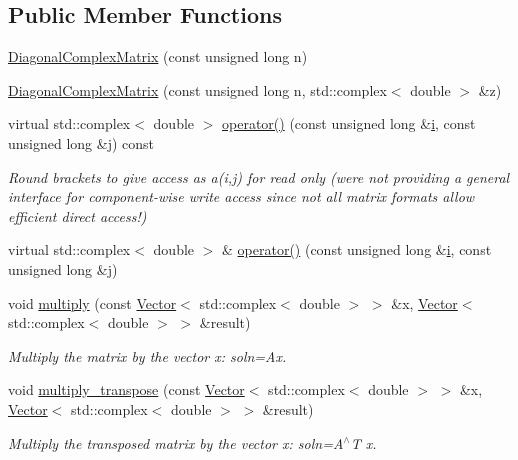 \subsection*{Public Member Functions}
\begin{DoxyCompactItemize}
\item 
\hyperlink{classoomph_1_1DiagonalComplexMatrix_a0d81ded85014d5a703c3a44522bef081}{Diagonal\+Complex\+Matrix} (const unsigned long n)
\item 
\hyperlink{classoomph_1_1DiagonalComplexMatrix_a896c2b0bdf1488b09b6552bb624c5408}{Diagonal\+Complex\+Matrix} (const unsigned long n, std\+::complex$<$ double $>$ \&z)
\item 
virtual std\+::complex$<$ double $>$ \hyperlink{classoomph_1_1DiagonalComplexMatrix_aa8f257263497d498f52881a19281ce63}{operator()} (const unsigned long \&\hyperlink{cfortran_8h_adb50e893b86b3e55e751a42eab3cba82}{i}, const unsigned long \&j) const
\begin{DoxyCompactList}\small\item\em Round brackets to give access as a(i,j) for read only (we\textquotesingle{}re not providing a general interface for component-\/wise write access since not all matrix formats allow efficient direct access!) \end{DoxyCompactList}\item 
virtual std\+::complex$<$ double $>$ \& \hyperlink{classoomph_1_1DiagonalComplexMatrix_a27f2ff667b59a6a115d04a6c40df82a1}{operator()} (const unsigned long \&\hyperlink{cfortran_8h_adb50e893b86b3e55e751a42eab3cba82}{i}, const unsigned long \&j)
\item 
void \hyperlink{classoomph_1_1DiagonalComplexMatrix_a8e7b0ca4ea51eb40fa9fe4fd8e9ba99c}{multiply} (const \hyperlink{classoomph_1_1Vector}{Vector}$<$ std\+::complex$<$ double $>$ $>$ \&x, \hyperlink{classoomph_1_1Vector}{Vector}$<$ std\+::complex$<$ double $>$ $>$ \&result)
\begin{DoxyCompactList}\small\item\em Multiply the matrix by the vector x\+: soln=Ax. \end{DoxyCompactList}\item 
void \hyperlink{classoomph_1_1DiagonalComplexMatrix_a1de87dc3b52ecb737d15893860c5844b}{multiply\+\_\+transpose} (const \hyperlink{classoomph_1_1Vector}{Vector}$<$ std\+::complex$<$ double $>$ $>$ \&x, \hyperlink{classoomph_1_1Vector}{Vector}$<$ std\+::complex$<$ double $>$ $>$ \&result)
\begin{DoxyCompactList}\small\item\em Multiply the transposed matrix by the vector x\+: soln=A$^\wedge$T x. \end{DoxyCompactList}\item 

\end{DoxyCompactItemize}
